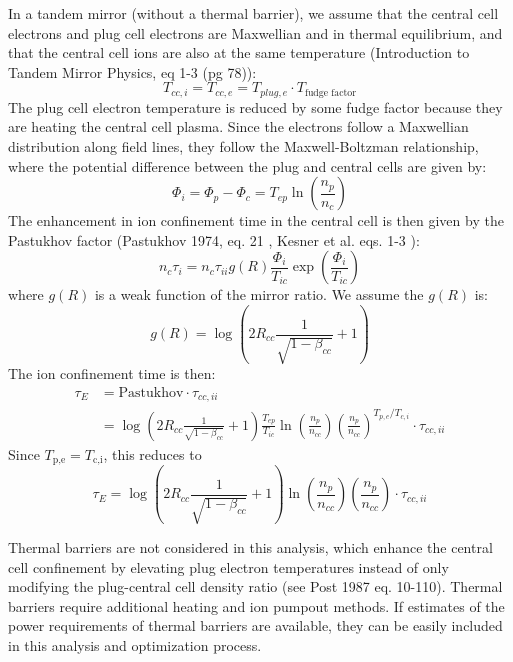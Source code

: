 In a tandem mirror (without a thermal barrier), we assume that the central cell electrons and plug cell electrons are Maxwellian and in thermal equilibrium, and that the central cell ions are also at the same temperature (Introduction to Tandem Mirror Physics, eq 1-3 (pg 78)):
\begin{equation}
    T_{cc,i} = T_{cc,e} = T_{plug,e} \cdot T_\text{fudge factor}
\end{equation}
The plug cell electron temperature is reduced by some fudge factor because they are heating the central cell plasma.
Since the electrons follow a Maxwellian distribution along field lines, they follow the Maxwell-Boltzman relationship, where the potential difference between the plug and central cells are given by: 
\begin{equation}
    \Phi_i=\Phi_p-\Phi_c=T_{ep}\ln\left(\frac{n_p}{n_c}\right)
\end{equation}
The enhancement in ion confinement time in the central cell is then given by the Pastukhov factor (Pastukhov 1974, eq. 21 \cite{Pastukhov_1974}, Kesner et al. eqs. 1-3 \cite{kesner1983introduction}):
\begin{equation}
    n_c \tau_i=n_c \tau_{ii} g(R) \frac{\Phi_i}{T_{ic}}\exp\left(\frac{\Phi_i}{T_{ic}}\right)
\end{equation}
where $g(R)$ is a weak function of the mirror ratio. We assume the $g(R)$ is:
\begin{equation}
    g(R) = \log \left(2 R_{cc} \frac{1}{\sqrt{1 - \beta_{cc}}} + 1 \right)
\end{equation}
The ion confinement time is then:
\begin{align}
    \tau_E &= \text{Pastukhov} \cdot \tau_{cc,ii} \\
    &= \log \left(2 R_{cc} \frac{1}{\sqrt{1 - \beta_{cc}}} + 1 \right) \frac{T_{ep}}{T_{ic}} \ln{\left( \frac{n_p}{n_{cc}}\right)} \left( \frac{n_p}{n_{cc}} \right)^{T_{p,e}/T_{c,i}} \cdot \tau_{cc,ii}
\end{align}
Since $T_\text{p,e} = T_\text{c,i}$, this reduces to
\begin{equation}
    \tau_E = \log \left(2 R_{cc} \frac{1}{\sqrt{1 - \beta_{cc}}} + 1 \right) \ln{\left( \frac{n_p}{n_{cc}}\right)} \left( \frac{n_p}{n_{cc}} \right) \cdot \tau_{cc,ii}
\end{equation}

Thermal barriers are not considered in this analysis, which enhance the central cell confinement by elevating plug electron temperatures instead of only modifying the plug-central cell density ratio (see Post 1987 eq. 10-110\cite{Post_1987}). Thermal barriers require additional heating and ion pumpout methods. If estimates of the power requirements of thermal barriers are available, they can be easily included in this analysis and optimization process.

